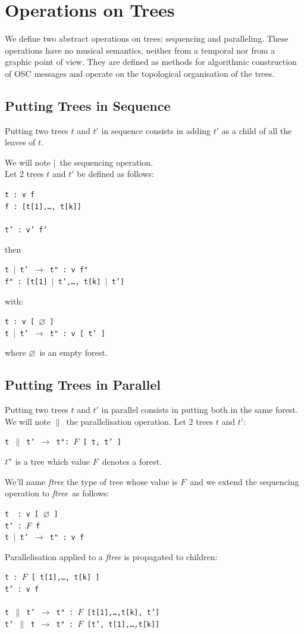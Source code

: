 \documentclass{article}
\newcommand{\op}	[1]		{\vspace{0mm}\begin{center}\colorbox{mygrey}{
							\begin{minipage}[t]{0.9\columnwidth} 
							{\small \texttt{#1}}
							\end{minipage}}\end{center}}
\newcommand{\nulltree}	{\ensuremath{\varnothing}}
\newcommand{\seq}		{\ensuremath{|}}
\newcommand{\paral}		{\ensuremath{\parallel}}
\newcommand{\foret}		{\ensuremath{F}}
\newcommand{\ftree}		{ftree}
\newcommand{\etc}		{…}
\begin{document}
\section{Operations on Trees}

We define two abstract operations on trees: sequencing and paralleling. These operations have no musical semantics, neither from a temporal nor from a graphic point of view. They are defined as methods for algorithmic construction of OSC messages and operate on the topological organisation of the trees. 

\subsection{Putting Trees in Sequence}
Putting two trees $t$ and $t'$ in sequence consists in adding $t'$ as a child of all the leaves of $t$.


We will note \seq\ the sequencing operation. \\
Let 2 trees $t$ and $t'$ be defined as follows:
\op{t :  v f \\
f : [t[1],\etc, t[k]] \\
\\
t' :  v' f'
}
then
\op{t \seq\ t'  $\to$  t" : v f" \\
f" : [t[1] \seq\ t',\etc, t[k] \seq\ t']
}
with: 
\op{t :  v [ \nulltree\ ]\\
t \seq\ t'  $\to$  t" : v [ t' ]
}
where \nulltree\ is an empty forest.

\subsection{Putting Trees in Parallel}
Putting two trees $t$ and $t'$ in parallel consists in putting both in the same forest.
We will note \paral\ the parallelisation operation. 
Let 2 trees $t$ and $t'$:
\op{t \paral\ t'  $\to$  t": \foret\ [ t, t' ]
}
$t"$ is a tree which value \foret\ denotes a forest. 

We'll name \emph{\ftree} the type of tree whose value is \foret\ and we extend the sequencing operation to \emph{\ftree}\ as follows:
\op{t \ :  v [ \nulltree\ ]\\
t' :  \foret\ f\\
t \seq\ t'  $\to$  t" : v f
}

Parallelisation applied to a \emph{\ftree} is propagated to children: 
\op{t :  \foret\ [ t[1],\etc, t[k] ]\\
t' :  v f\\
\\
t \paral\ t'  $\to$  t" : \foret\ [t[1],\etc,t[k], t']\\
t' \paral\ t  $\to$  t" : \foret\ [t', t[1],\etc,t[k]]
}
\end{document}

